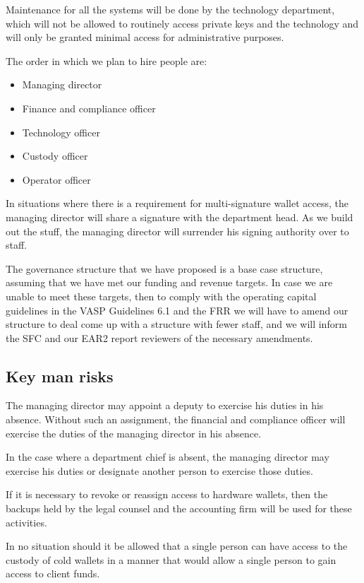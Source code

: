 Maintenance for all the systems will be done by the technology
department, which will not be allowed to routinely access private keys
and the technology and will only be granted minimal access for
administrative purposes.

The order in which we plan to hire people are:

\begin{itemize}
\item Managing director
\item Finance and compliance officer
\item Technology officer 
\item Custody officer
\item Operator officer
\end{itemize}

In situations where there is a requirement for multi-signature wallet
access, the managing director will share a signature with the
department head.  As we build out the stuff, the managing director
will surrender his signing authority over to staff.

The governance structure that we have proposed is a base case
structure, assuming that we have met our funding and revenue targets.
In case we are unable to meet these targets, then to comply with the
operating capital guidelines in the VASP Guidelines 6.1 and the FRR we
will have to amend our structure to deal come up with a structure with
fewer staff, and we will inform the SFC and our EAR2 report reviewers
of the necessary amendments.

\subsection{Key man risks}
The managing director may appoint a deputy to exercise his duties in
his absence.  Without such an assignment, the financial and
compliance officer will exercise the duties of the managing director
in his absence.

In the case where a department chief is absent, the managing director
may exercise his duties or designate another person to exercise those
duties.

If it is necessary to revoke or reassign access to hardware wallets,
then the backups held by the legal counsel and the accounting firm
will be used for these activities.

In no situation should it be allowed that a single person can
have access to the custody of cold wallets in a manner that would allow a
single person to gain access to client funds.

